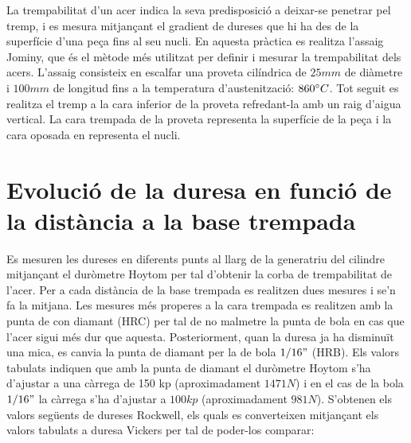 \documentclass[a4paper]{report}
\begin{document}
La trempabilitat d'un acer indica la seva predisposició a deixar-se penetrar pel tremp, i es mesura mitjançant el gradient de dureses que hi ha des de la superfície d'una peça fins al seu nucli. En aquesta pràctica es realitza l'assaig Jominy, que és el mètode més utilitzat per definir i mesurar la trempabilitat dels acers. L'assaig consisteix en escalfar una proveta cilíndrica de $25 mm$ de diàmetre i $100 mm$ de longitud fins a la temperatura d'austenització: $860 \degree C$. Tot seguit es realitza el tremp a la cara inferior de la proveta refredant-la amb un raig d'aigua vertical. La cara trempada de la proveta representa la superfície de la peça i la cara oposada en representa el nucli. 

\section{Evolució de la duresa en funció de la distància a la base trempada}
Es mesuren les dureses en diferents punts al llarg de la generatriu del cilindre mitjançant el duròmetre Hoytom per tal d'obtenir la corba de trempabilitat de l'acer. Per a cada distància de la base trempada es realitzen dues mesures i se'n fa la mitjana. Les mesures més properes a la cara trempada es realitzen amb la punta de con diamant (HRC) per tal de no malmetre la punta de bola en cas que l'acer sigui més dur que aquesta. Posteriorment, quan la duresa ja ha disminuït una mica, es canvia la punta de diamant per la de bola $1/16"$ (HRB). Els valors tabulats indiquen que amb la punta de diamant el duròmetre Hoytom s'ha d'ajustar a una càrrega de 150 kp (aproximadament $1471 N$) i en el cas de la bola $1/16"$ la càrrega s'ha d'ajustar a $100 kp$ (aproximadament $981 N$). S'obtenen els valors següents de dureses Rockwell, els quals es converteixen mitjançant els valors tabulats a duresa Vickers per tal de poder-los comparar:
\end{document}

